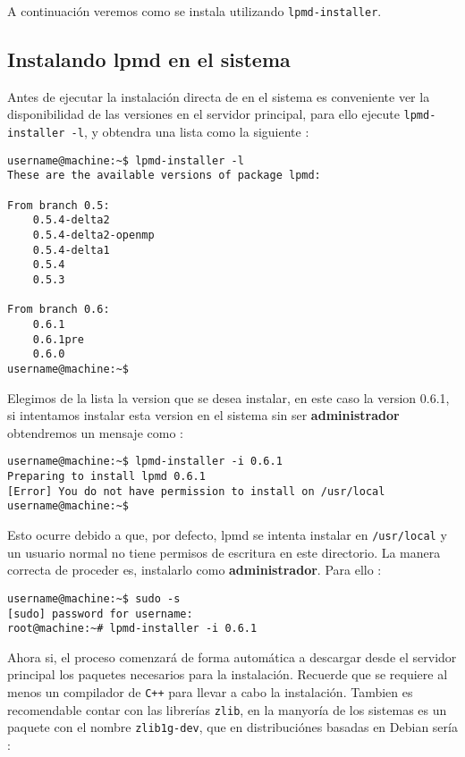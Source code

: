 A continuaci\'on veremos como se instala {\lpmd} utilizando \verb|lpmd-installer|.

\subsection{Instalando lpmd en el sistema}

Antes de ejecutar la instalaci\'on directa de {\lpmd} en el sistema es conveniente ver la disponibilidad de las versiones en el servidor principal, para ello ejecute \verb|lpmd-installer -l|, y obtendra una lista como la siguiente :

\begin{verbatim}
username@machine:~$ lpmd-installer -l
These are the available versions of package lpmd:

From branch 0.5: 
    0.5.4-delta2
    0.5.4-delta2-openmp
    0.5.4-delta1
    0.5.4
    0.5.3

From branch 0.6: 
    0.6.1
    0.6.1pre
    0.6.0
username@machine:~$
\end{verbatim}

Elegimos de la lista la version que se desea instalar, en este caso la version 0.6.1, si intentamos instalar esta version en el sistema sin ser \textbf{administrador} obtendremos un mensaje como  :

\begin{verbatim}
username@machine:~$ lpmd-installer -i 0.6.1
Preparing to install lpmd 0.6.1
[Error] You do not have permission to install on /usr/local
username@machine:~$
\end{verbatim}

Esto ocurre debido a que, por defecto, lpmd se intenta instalar en \verb|/usr/local| y un usuario normal no tiene permisos de escritura en este directorio. La manera correcta de proceder es, instalarlo como \textbf{administrador}. Para ello :

\begin{verbatim}
username@machine:~$ sudo -s
[sudo] password for username: 
root@machine:~# lpmd-installer -i 0.6.1
\end{verbatim}

Ahora si, el proceso comenzar\'a de forma autom\'atica a descargar desde el servidor principal los paquetes necesarios para la instalaci\'on. Recuerde que se requiere al menos un compilador de \verb|C++| para llevar a cabo la instalaci\'on. Tambien es recomendable contar con las librer\'ias \verb|zlib|, en la manyor\'ia de los sistemas es un paquete con el nombre \verb|zlib1g-dev|, que en distribuci\'ones basadas en Debian ser\'ia :

